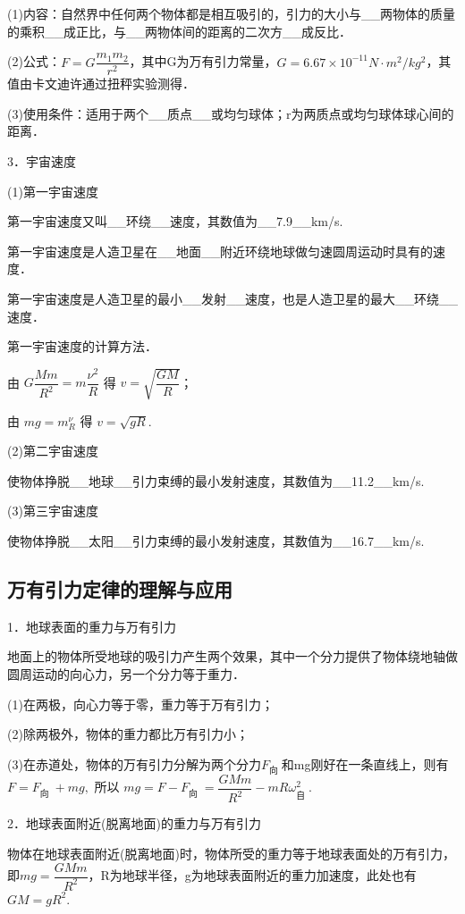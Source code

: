 \documentclass[cn,10.5pt,chinese,mac,chinesefont=founder]{elegantbook}
\begin{document}
(1)内容：自然界中任何两个物体都是相互吸引的，引力的大小与\_\_两物体的质量的乘积\_\_成正比，与\_\_两物体间的距离的二次方\_\_成反比．

(2)公式：$F=G\dfrac{m_1m_2}{r^2}$，其中G为万有引力常量，$G=6.67\times 10^{-11} N·m^2/kg^2$，其值由卡文迪许通过扭秤实验测得．

(3)使用条件：适用于两个\_\_质点\_\_或均匀球体；r为两质点或均匀球体球心间的距离．

3．宇宙速度

(1)第一宇宙速度

第一宇宙速度又叫\_\_环绕\_\_速度，其数值为\_\_7.9\_\_km/s.

第一宇宙速度是人造卫星在\_\_地面\_\_附近环绕地球做匀速圆周运动时具有的速度．

第一宇宙速度是人造卫星的最小\_\_发射\_\_速度，也是人造卫星的最大\_\_环绕\_\_速度．

第一宇宙速度的计算方法．

由 $G \dfrac{M m}{R^{2}}=m \dfrac{\nu^{2}}{R}$ 得 $v=\sqrt{\dfrac{G M}{R}}$；

由 $m g=m_{R}^{\nu}$ 得 $v=\sqrt{g R}$.

(2)第二宇宙速度

使物体挣脱\_\_地球\_\_引力束缚的最小发射速度，其数值为\_\_11.2\_\_km/s.

(3)第三宇宙速度

使物体挣脱\_\_太阳\_\_引力束缚的最小发射速度，其数值为\_\_16.7\_\_km/s.

\newpage
\subsection{万有引力定律的理解与应用}

1．地球表面的重力与万有引力

地面上的物体所受地球的吸引力产生两个效果，其中一个分力提供了物体绕地轴做圆周运动的向心力，另一个分力等于重力．

(1)在两极，向心力等于零，重力等于万有引力；

(2)除两极外，物体的重力都比万有引力小；

(3)在赤道处，物体的万有引力分解为两个分力$F_{\text {向 }}$和mg刚好在一条直线上，则有$F=F_{\text {向 }}+m g,$ 所以 $m g=F-F_{\text {向 }}=\dfrac{G M m}{R^{2}}-m R \omega_{\text {自 }}^{2}$.

2．地球表面附近(脱离地面)的重力与万有引力

物体在地球表面附近(脱离地面)时，物体所受的重力等于地球表面处的万有引力，即$m g=\dfrac{G M m}{R^{2}}$，R为地球半径，g为地球表面附近的重力加速度，此处也有$G M=g R^{2}$.
\end{document}
